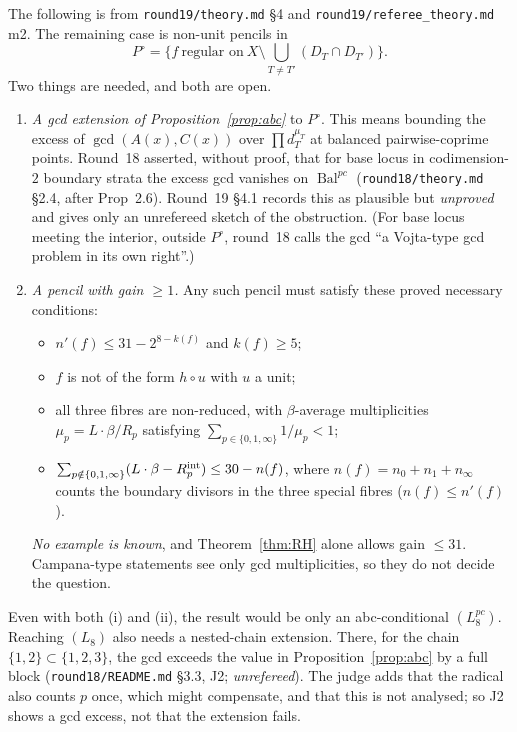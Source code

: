 \documentclass[11pt]{article}
\newcommand{\Bal}{\operatorname{Bal}}
\newcommand{\rec}[1]{\texttt{#1}}
\begin{document}
The following is from \rec{round19/theory.md} \S4 and
\rec{round19/referee\_theory.md} m2.  The remaining case is non-unit pencils
in
\[
  P^\circ=\Big\{f\ \text{regular on}\ X\setminus\textstyle\bigcup_{T\ne T'}(D_T\cap D_{T'})\Big\}.
\]
Two things are needed, and both are open.
\begin{enumerate}[label=(\roman*),leftmargin=2em]
  \item \emph{A gcd extension of Proposition~\ref{prop:abc}} to \(P^\circ\).
    This means bounding the excess of \(\gcd(A(x),C(x))\) over
    \(\prod d_T^{\mu_T}\) at balanced pairwise-coprime points.  Round~18
    asserted, without proof, that for base locus in codimension-\(2\) boundary
    strata the excess gcd vanishes on \(\Bal^{pc}\) (\rec{round18/theory.md}
    \S2.4, after Prop~2.6).  Round~19 \S4.1 records this as plausible but
    \emph{unproved} and gives only an unrefereed sketch of the obstruction.
    (For base locus meeting the interior, outside \(P^\circ\), round~18 calls
    the gcd ``a Vojta-type gcd problem in its own right''.)
  \item \emph{A pencil with gain \(\ge1\).}  Any such pencil must satisfy these
    proved necessary conditions:
    \begin{itemize}
      \item \(n'(f)\le31-2^{8-k(f)}\) and \(k(f)\ge5\);
      \item \(f\) is not of the form \(h\circ u\) with \(u\) a unit;
      \item all three fibres are non-reduced, with \(\beta\)-average
        multiplicities \(\mu_p=L\cdot\beta/R_p\) satisfying
        \(\sum_{p\in\{0,1,\infty\}}1/\mu_p<1\);
      \item \(\sum_{p\notin\{0,1,\infty\}}(L\cdot\beta-R_p^{\rm int})\le30-n(f)\),
        where \(n(f)=n_0+n_1+n_\infty\) counts the boundary divisors in the
        three special fibres (\(n(f)\le n'(f)\)).
    \end{itemize}
    \emph{No example is known}, and Theorem~\ref{thm:RH} alone allows gain
    \(\le31\).  Campana-type statements see only gcd multiplicities, so they
    do not decide the question.
\end{enumerate}

Even with both (i) and (ii), the result would be only an abc-conditional
\((L_8^{pc})\).  Reaching \((L_8)\) also needs a nested-chain extension.
There, for the chain \(\{1,2\}\subset\{1,2,3\}\), the gcd exceeds the value in
Proposition~\ref{prop:abc} by a full block (\rec{round18/README.md} \S3.3, J2;
\emph{unrefereed}).  The judge adds that the radical also counts \(p\) once,
which might compensate, and that this is not analysed; so J2 shows a gcd
excess, not that the extension fails.
\end{document}
